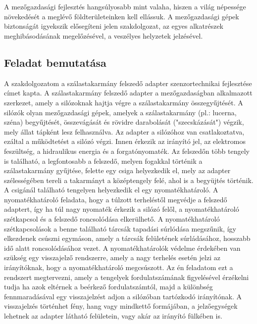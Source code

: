 \chapter{\bevezetes}

A mezőgazdasági fejlesztés hangsúlyosabb mint valaha, hiszen a világ népessége növekedését a meglévő földterületeinken kell ellássuk. A mezőgazdasági gépek biztonságát igyekszik elősegíteni jelen szakdolgozat, az egyes alkatrészek meghibásodásának megelőzésével, a veszélyes helyzetek jelzésével. 

\section{Feladat bemutatása}

A szakdolgozatom a szálastakarmány felszedő adapter szenzortechnikai fejlesztése címet kapta. A szálastakarmány felszedő adapter a mezőgazdaságban alkalmazott szerkezet, amely a silózoknak hajtja végre a szálastakarmány összegyűjtését. A silózók olyan mezőgazdasági gépek, amelyek a szálastakarmány (pl.: lucerna, széna) begyűjtését, összevágását és rövidre darabolását ("szecskázását") végzik, mely állat tápként lesz felhasználva. Az adapter a silózóhoz van csatlakoztatva, ezáltal a működtetést a silózó végzi. Innen érkezik az irányító jel, az elektromos feszültség, a hidraulikus energia és a forgatónyomaték. Az felszedőn több tengely is található, a legfontosabb a felszedő, melyen fogakkal történik a szálastakarmány gyűjtése, felette egy csiga helyezkedik el, mely az adapter szélességében tereli a takarmányt a középtengely felé, ahol is a begyüjtés történik. A csigánál található tengelyen helyezkedik el egy nyomatékhatároló. A nyomatékhatároló feladata, hogy a túlzott terheléstől megvédje a felszedő adaptert, így ha túl nagy nyomaték érkezik a silózó felől, a nyomatékhatároló szétkapcsol és a felszedő roncsolódása elkerülhető. A nyomatékhatároló szétkapcsolások a benne található tárcsák tapadási súrlódása megszűnik, így elkezdenek csúszni egymáson, amely a tárcsák felületének súrládásához, hosszabb idő alatt roncsolódásához vezet. A nyomatékhatárolók védelme érdekében van szükség egy visszajelző rendszerre, amely a nagy terhelés esetén jelzi az irányítóknak, hogy a nyomatékhatároló megcsúszott.
Az én feladatom ezt a rendszert megtervezni, amely a tengelyek fordulatszámának figyelésével érzékelni tudja ha azok eltérnek a beérkező fordulatszámtól, majd a különbség fennmaradásával egy visszajelzést adjon a silózóban tartózkodó irányítónak. A visszajelzés történhet fény, hang vagy mindkettő formájában, a jelzőegységek lehetnek az adapter látható felületein, vagy akár az irányító fülkében is.

